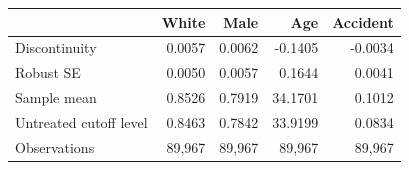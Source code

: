 \begin{center}\small
\renewcommand{\arraystretch}{1.15}
\begin{tabular}{@{}lrrrr@{}}\toprule
 & White & Male & Age & Accident\\\midrule
Discontinuity & 0.0057 & 0.0062 & -0.1405 & -0.0034\\
Robust SE & 0.0050 & 0.0057 & 0.1644 & 0.0041\\
Sample mean & 0.8526 & 0.7919 & 34.1701 & 0.1012\\
Untreated cutoff level & 0.8463 & 0.7842 & 33.9199 & 0.0834\\
Observations & 89,967 & 89,967 & 89,967 & 89,967\\
\bottomrule\end{tabular}\end{center}
